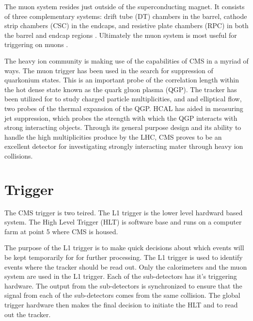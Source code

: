 The muon system resides just outside of the superconducting magnet.
It consists of three complementary systems: drift tube (DT) chambers in the
	barrel, cathode strip chambers (CSC) in the endcaps, and resistive 
	plate chambers (RPC) in both the barrel and endcap regions \cite{tCmsE}.
Ultimately the muon system is most useful for triggering on muons \cite{tCmsE}.

The heavy ion community is making use of the capabilities of CMS in a myriad of
	ways.
The muon trigger has been used in the search for suppression of quarkonium 
	states. 
This is an important probe of the correlation length within the hot dense state
	known as the quark gluon plasma (QGP).
The tracker has been utilized for to study charged particle multiplicities, and
	and elliptical flow, two probes of the thermal expansion of the QGP.
HCAL has aided in measuring jet suppression, which probes the strength with 
	which the QGP interacts with strong interacting objects.
Through its general purpose design and its ability to handle the high
	multiplicities produce by the LHC, CMS proves to be an excellent 
	detector for investigating strongly interacting mater through heavy ion
	collisions. 
  \section{Trigger}
    The CMS trigger is two teired. 
    The L1 trigger is the lower level hardward based system. 
    The High Level Trigger (HLT) is software base and runs on a computer farm
      at point 5 where CMS is housed.

    The purpose of the L1 trigger is to make quick decisions about which events
      will be kept temporarily for for further processing.
    The L1 trigger is used to identify events where the tracker should be read
      out.
    Only the calorimeters and the muon system are used in the L1 trigger.
    Each of the sub-detectors has it's triggering hardware.
    The output from the sub-detectors is synchronized to ensure that the signal
      from each of the sub-detectors comes from the same collision. 
    The global trigger hardware then makes the final decision to initiate the 
      HLT and to read out the tracker. 

